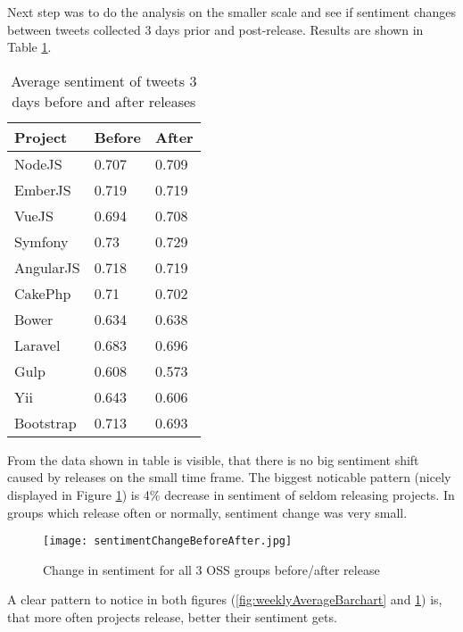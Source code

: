 Next step was to do the analysis on the smaller scale and see if sentiment changes between tweets collected 3 days prior and post-release. Results are shown in Table \ref{table:BeforeAfterReleaseSentiment}.

\begin{table}[H]
\centering
\begin{tabular}{ |p{3cm}|p{3cm}|p{3cm}|}
 \hline
\textbf{Project }& \textbf{Before}& \textbf{After}\\
 \hline
 NodeJS   & 0.707 & 0.709\\ \hline
 EmberJS   & 0.719 & 0.719\\ \hline
 VueJS   & 0.694 & 0.708\\ \hline 
 Symfony & 0.73 & 0.729\\ \hline   
 AngularJS   & 0.718 & 0.719\\ \hline
 CakePhp & 0.71 & 0.702\\ \hline 
 Bower   & 0.634 & 0.638\\ \hline 
 Laravel & 0.683 & 0.696\\ \hline
 Gulp & 0.608 & 0.573\\ \hline
 Yii & 0.643 & 0.606\\ \hline
 Bootstrap & 0.713 & 0.693\\ \hline
\end{tabular}
\caption{Average sentiment of tweets 3 days before and after releases}
\label{table:BeforeAfterReleaseSentiment}
\end{table}

From the data shown in table is visible, that there is no big sentiment shift caused by releases on the small time frame. The biggest noticable pattern (nicely displayed in Figure \ref{fig:sentimentChangeBeforeAfter}) is 4\% decrease in sentiment of seldom releasing projects. In groups which release often or normally, sentiment change was very small.

\begin{figure}[H]%
    \centering
	\texttt{[image: sentimentChangeBeforeAfter.jpg]}
    \caption{Change in sentiment for all 3 OSS groups before/after release}%
    \label{fig:sentimentChangeBeforeAfter}%
\end{figure}

A clear pattern to notice in both figures (\ref{fig:weeklyAverageBarchart} and \ref{fig:sentimentChangeBeforeAfter}) is, that more often projects release, better their sentiment gets.